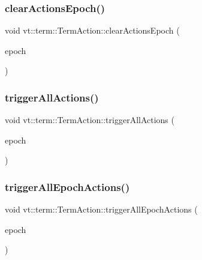 \subsubsection{\texorpdfstring{clear\+Actions\+Epoch()}{clearActionsEpoch()}}
{\footnotesize\ttfamily void vt\+::term\+::\+Term\+Action\+::clear\+Actions\+Epoch (\begin{DoxyParamCaption}\item[{\hyperlink{namespacevt_a985a5adf291c34a3ca263b3378388236}{Epoch\+Type} const \&}]{epoch }\end{DoxyParamCaption})}

\mbox{\label{structvt_1_1term_1_1_term_action_a0cf69a46cb567f12844745cb37a91971}} 
\subsubsection{\texorpdfstring{trigger\+All\+Actions()}{triggerAllActions()}}
{\footnotesize\ttfamily void vt\+::term\+::\+Term\+Action\+::trigger\+All\+Actions (\begin{DoxyParamCaption}\item[{\hyperlink{namespacevt_a985a5adf291c34a3ca263b3378388236}{Epoch\+Type} const \&}]{epoch }\end{DoxyParamCaption})\hspace{0.3cm}{\ttfamily [protected]}}

\mbox{\label{structvt_1_1term_1_1_term_action_a23cc1dcce197af4e2e81fa659d952d94}} 
\subsubsection{\texorpdfstring{trigger\+All\+Epoch\+Actions()}{triggerAllEpochActions()}}
{\footnotesize\ttfamily void vt\+::term\+::\+Term\+Action\+::trigger\+All\+Epoch\+Actions (\begin{DoxyParamCaption}\item[{\hyperlink{namespacevt_a985a5adf291c34a3ca263b3378388236}{Epoch\+Type} const \&}]{epoch }\end{DoxyParamCaption})\hspace{0.3cm}{\ttfamily [protected]}}



